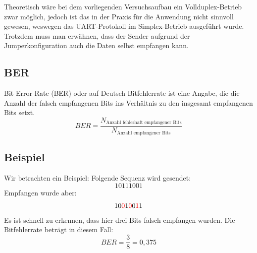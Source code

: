 Theoretisch wäre bei dem vorliegenden Versuchsaufbau ein Vollduplex-Betrieb zwar möglich, jedoch ist das in der Praxis für die Anwendung nicht sinnvoll gewesen, weswegen das UART-Protokoll im Simplex-Betrieb ausgeführt wurde.
Trotzdem muss man erwähnen, dass der Sender aufgrund der Jumperkonfiguration auch die Daten selbst empfangen kann.

\subsection{BER}
Bit Error Rate (BER) oder auf Deutsch Bitfehlerrate ist eine Angabe, die die
Anzahl der falsch empfangenen Bits ins Verhältnis zu den insgesamt empfangenen Bits setzt.
\begin{equation}
    BER = \frac{N_{\text{Anzahl fehlerhaft empfangener Bits}}}{N_{\text{Anzahl empfangener Bits}}}
\end{equation}
\subsection{Beispiel}
Wir betrachten ein Beispiel: Folgende Sequenz wird gesendet:
\begin{equation}
    10111001
\end{equation}
Empfangen wurde aber:
\begin{equation}
      10\textcolor{red}{0}1\textcolor{red}{0}0\textcolor{red}{1}1
\end{equation}
Es ist schnell zu erkennen, dass hier drei Bits falsch empfangen wurden.
Die Bitfehlerrate beträgt in diesem Fall:
\begin{equation}
    BER = \frac{3}{8} = 0{,}375
\end{equation}
